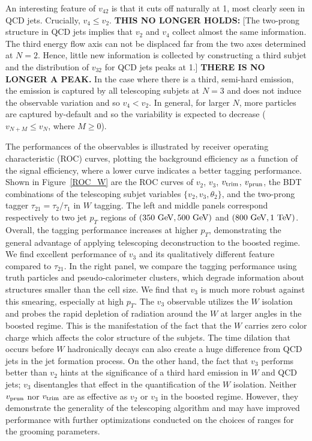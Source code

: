 \documentclass[aps,prl,floatfix,preprintnumbers,twocolumn,groupedaddress,nofootinbib]{revtex4-1}
\begin{document}
An interesting feature of $v_{42}$ is that it cuts off naturally at 1, most clearly seen in QCD jets. Crucially, $v_{4} \leq v_{2}$. \textbf{THIS NO LONGER HOLDS:} [The two-prong structure in QCD jets implies that $v_{2}$ and $v_{4}$ collect almost the same information. The third energy flow axis can not be displaced far from the two axes determined at $N=2$. Hence, little new information is collected by constructing a third subjet and the distribution of $v_{32}$ for QCD jets peaks at 1.] \textbf{THERE IS NO LONGER A PEAK.} In the case where there is a third, semi-hard emission, the emission is captured by all telescoping subjets at $N=3$ and does not induce the observable variation and so $v_{4} < v_{2}$. In general, for larger $N$, more particles are captured by-default and so the variability is expected to decrease ($v_{N+M}\leq v_{N}$, where $M \geq 0$).

The performances of the observables is illustrated by receiver operating characteristic (ROC) curves, plotting the background efficiency as a function of the signal efficiency, where a lower curve indicates a better tagging performance. Shown in Figure~\ref{ROC_W} are the ROC curves of $v_2$, $v_3$, $v_{\rm trim}$, $v_{\rm prun}$, the BDT combinations of the telescoping subjet variables $\{v_2, v_3, \theta_2\}$, and the two-prong tagger $\tau_{21}=\tau_{2}/\tau_{1}$ in $W$ tagging. The left and middle panels correspond respectively to two jet $p_T$ regions of $(350~{\rm GeV}, 500~{\rm GeV})$ and $(800~{\rm GeV}, 1~{\rm TeV})$. Overall, the tagging performance increases at higher $p_T$, demonstrating the general advantage of applying telescoping deconstruction to the boosted regime. We find excellent performance of $v_3$ and its qualitatively different feature compared to $\tau_{21}$. In the right panel, we compare the tagging performance using truth particles and pseudo-calorimeter clusters, which degrade information about structures smaller than the cell size. We find that $v_3$ is much more robust against this smearing, especially at high $p_T$. The $v_3$ observable utilizes the $W$ isolation and probes the rapid depletion of radiation around the $W$ at larger angles in the boosted regime. This is the manifestation of the fact that the $W$ carries zero color charge which affects the color structure of the subjets. The time dilation that occurs before $W$ hadronically decays can also create a huge difference from QCD jets in the jet formation process. On the other hand, the fact that $v_3$ performs better than $v_2$ hints at the significance of a third hard emission in $W$ and QCD jets; $v_3$ disentangles that effect in the quantification of the $W$ isolation. Neither $v_{\rm{prun}}$ nor $v_{\rm{trim}}$ are as effective as $v_2$ or $v_3$ in the boosted regime. However, they demonstrate the generality of the telescoping algorithm and may have improved performance with further optimizations conducted on the choices of ranges for the grooming parameters.
\end{document}
